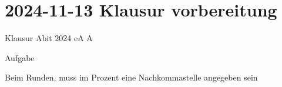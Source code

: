 \section{2024-11-13 Klausur vorbereitung}

\startframedtipp
Klausur Abit 2024 eA A

Aufgabe 

Beim Runden, muss im Prozent eine Nachkommastelle angegeben sein
\stopframedtipp
